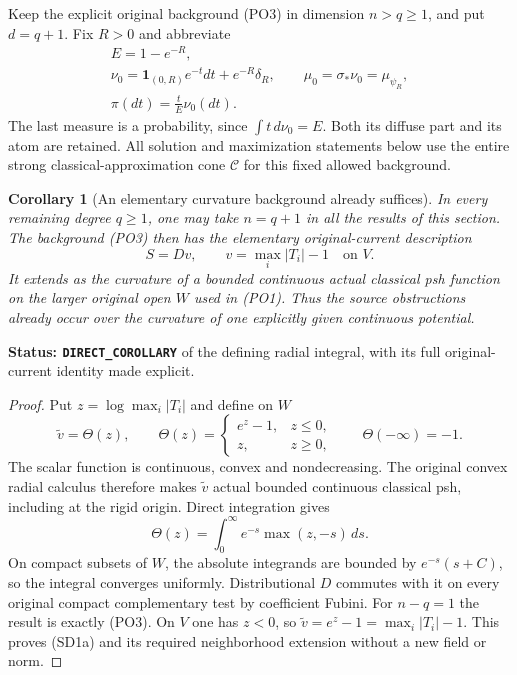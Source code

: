\documentclass[11pt,a4paper]{article}
\numberwithin{equation}{section}
\newtheorem{corollary}[theorem]{Corollary}
\theoremstyle{definition}
\theoremstyle{remark}
\begin{document}
Keep the explicit original background \textup{(PO3)} in
dimension $n>q\ge1$, and put $d=q+1$.  Fix $R>0$ and abbreviate
\[
 \begin{gathered}
 E=1-e^{-R},\\
 \nu_0=\mathbf1_{(0,R)}e^{-t}dt+e^{-R}\delta_R,
       \qquad \mu_0=\sigma_*\nu_0=\mu_{\psi_R},\\
             \pi(dt)=\frac{t}{E}\nu_0(dt).
 \end{gathered}
 \tag{SD1}
\]
The last measure is a probability, since
$\int t\,d\nu_0=E$.  Both its diffuse part and its atom
are retained.  All solution and maximization statements
below use the entire strong classical-approximation cone
$\mathscr C$ for this fixed allowed background.

\begin{corollary}[An elementary curvature background already suffices]
\label{cor:r12-elementary-codimension-one-background}
In every remaining degree $q\ge1$, one may take
$n=q+1$ in all the results of this section.  The
background \textup{(PO3)} then has the elementary
original-current description
\[
                  S=Dv,\qquad
                  v=\max_i|T_i|-1\quad\text{on }V.
 \tag{SD1a}
\]
It extends as the curvature of a bounded continuous
actual classical psh function on the larger original
open $W$ used in \textup{(PO1)}.  Thus the source
obstructions already occur over the curvature of
one explicitly given continuous potential.
\end{corollary}

\noindent\textbf{Status: \texttt{DIRECT\_COROLLARY}}
of the defining radial integral, with its full
original-current identity made explicit.

\begin{proof}
Put $z=\log\max_i|T_i|$ and define on $W$
\[
 \widetilde v=\Theta(z),\qquad
 \Theta(z)=
 \begin{cases}
 e^z-1,&z\le0,\\
 z,&z\ge0,
 \end{cases}
 \qquad\Theta(-\infty)=-1.
\]
The scalar function is continuous, convex and
nondecreasing.  The original convex radial calculus
therefore makes $\widetilde v$ actual bounded
continuous classical psh, including at the rigid
origin.  Direct integration gives
\[
              \Theta(z)=\int_0^\infty
                               e^{-s}\max(z,-s)\,ds.
\]
On compact subsets of $W$, the absolute integrands
are bounded by $e^{-s}(s+C)$, so the integral
converges uniformly.  Distributional $D$ commutes
with it on every original compact complementary
test by coefficient Fubini.  For $n-q=1$ the
result is exactly \textup{(PO3)}.  On $V$ one
has $z<0$, so $\widetilde v=e^z-1=\max_i|T_i|-1$.
This proves \textup{(SD1a)} and its required
neighborhood extension without a new field or norm.
\end{proof}
\end{document}
